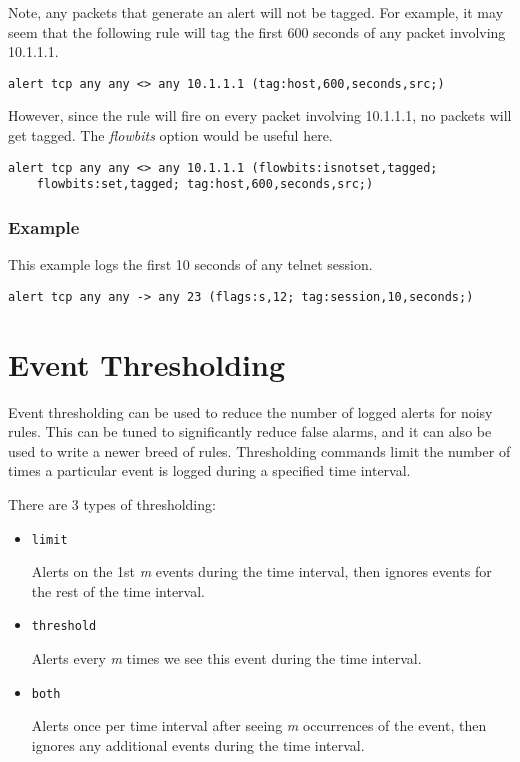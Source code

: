 \documentclass[english]{report}
\begin{document}
Note, any packets that generate an alert will not be tagged.  For example, it may seem that the following rule will tag the first 600 seconds of any packet involving 10.1.1.1.
\begin{verbatim}
alert tcp any any <> any 10.1.1.1 (tag:host,600,seconds,src;)
\end{verbatim}

However, since the rule will fire on every packet involving 10.1.1.1, no packets will get tagged.  The \emph{flowbits} option would be useful here.

\begin{verbatim}
alert tcp any any <> any 10.1.1.1 (flowbits:isnotset,tagged; 
    flowbits:set,tagged; tag:host,600,seconds,src;)
\end{verbatim}

\subsubsection{Example}

This example logs the first 10 seconds of any telnet session.
\begin{verbatim}
alert tcp any any -> any 23 (flags:s,12; tag:session,10,seconds;)
\end{verbatim}


\section{Event Thresholding\label{Event Thresholding}}

Event thresholding can be used to reduce the number of logged alerts for noisy
rules.  This can be tuned to significantly reduce false alarms, and it can also
be used to write a newer breed of rules. Thresholding commands limit the number
of times a particular event is logged during a specified time interval. 

There are 3 types of thresholding:

\begin{itemize} 

\item \texttt{limit} 

Alerts on the 1st \textit{m} events during the time interval, then ignores events for the
rest of the time interval.

\item \texttt{threshold} 

Alerts every \textit{m} times we see this event during the time interval.

\item \texttt{both} 

Alerts once per time interval after seeing \textit{m} occurrences of the event, then
ignores any additional events during the time interval.
\end{itemize}
\end{document}

